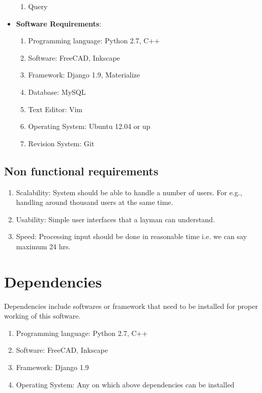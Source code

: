 \begin{itemize}
\begin{enumerate}
\item Query
\end{enumerate}
\vskip 0.5cm 
\item \textbf{Software Requirements}:
\begin{enumerate} 
\item Programming language: Python 2.7, C++
\item Software: FreeCAD, Inkscape
\item Framework: Django 1.9, Materialize
\item Database: MySQL
\item Text Editor: Vim
\item Operating System: Ubuntu 12.04 or up
\item Revision System: Git
\end{enumerate}
\end{itemize}

\subsection{Non functional requirements}
\begin{enumerate}
\item Scalability: System should be able to handle a number of users. For e.g., handling
around thousand users at the same time.
\item Usability: Simple user interfaces that a layman can understand.
\item Speed: Processing input should be done in reasonable time i.e. we can say maximum
24 hrs.
\end{enumerate}



\section{Dependencies}                                                  
Dependencies include softwares or framework that need to be installed for 
proper working of this software.                                        
                                                                        
\begin{enumerate}                                                       
\item Programming language: Python 2.7, C++                                  
\item Software: FreeCAD, Inkscape                             
\item Framework: Django 1.9                                             
\item Operating System: Any on which above dependencies can be installed
\end{enumerate}


